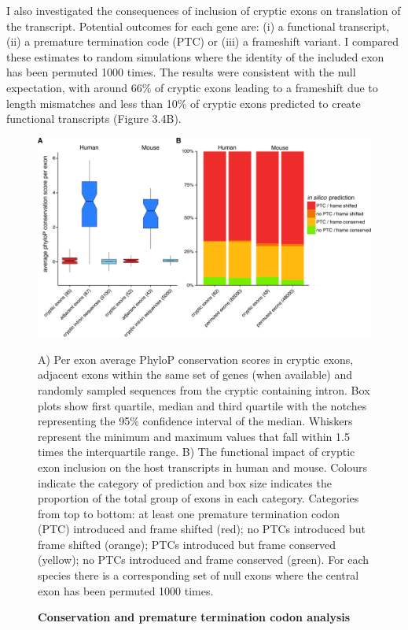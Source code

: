 I also investigated the consequences of inclusion of cryptic exons on translation of the transcript. Potential outcomes for each gene are: (i) a functional transcript, (ii) a premature termination code (PTC) or (iii) a frameshift variant. I compared these estimates to random simulations where the identity of the included exon has been permuted 1000 times. The results were consistent with the null expectation, with around 66\% of cryptic exons leading to a frameshift due to length mismatches and less than 10\% of cryptic exons predicted to create functional transcripts (Figure 3.4B).

\begin{figure}[h!]
	\centering
	\includegraphics[width=\textwidth]{Figures/03_cryptic_exons/Figure_4_conservation_poison.png}
	\caption{\textbf{Conservation and premature termination codon analysis}} 
		A) Per exon average PhyloP conservation scores in cryptic exons, adjacent exons within the same set of genes (when available) and randomly sampled sequences from the cryptic containing intron. Box plots show first quartile, median and third quartile with the notches representing the 95\% confidence interval of the median. Whiskers represent the minimum and maximum values that fall within 1.5 times the interquartile range. B) The functional impact of cryptic exon inclusion on the host transcripts in human and mouse. Colours indicate the category of prediction and box size indicates the proportion of the total group of exons in each category. Categories from top to bottom: at least one premature termination codon (PTC) introduced and frame shifted (red); no PTCs introduced but frame shifted (orange); PTCs introduced but frame conserved (yellow); no PTCs introduced and frame conserved (green). For each species there is a corresponding set of null exons where the central exon has been permuted 1000 times.
	\label{fig:cryptic_conservation}
\end{figure}

